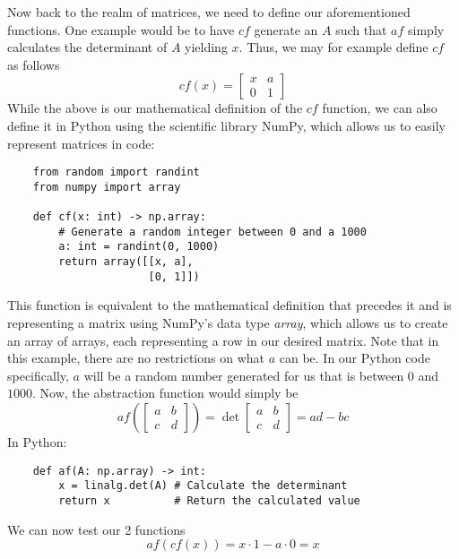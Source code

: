 Now back to the realm of matrices, we need to define our aforementioned
functions. One example would be to have $ cf $ generate an $ A $ such that $ af
$ simply calculates the determinant of $ A $ yielding $ x $. Thus, we may for
example define $ cf $ as follows
\begin{equation*}
    cf(x)
    =
    \begin{bmatrix}
        x & a \\
        0 & 1
    \end{bmatrix}
\end{equation*}
While the above is our mathematical definition of the $ cf $ function, we can
also define it in Python using the scientific library NumPy, which allows us to
easily represent matrices in code:
\begin{verbatim}
    from random import randint
    from numpy import array

    def cf(x: int) -> np.array:
        # Generate a random integer between 0 and a 1000
        a: int = randint(0, 1000)
        return array([[x, a],
                      [0, 1]])
\end{verbatim}
This function is equivalent to the mathematical definition that precedes it and
is representing a matrix using NumPy's data type \textit{array}, which allows
us to
create an array of arrays, each representing a row in our desired matrix. Note
that in this example, there are no restrictions on what $ a $ can be. In our
Python code specifically, $ a $ will be a random number generated for us that
is between $ 0
$ and $ 1000 $. Now, the abstraction
function would simply be
\begin{equation*}
    af \left(
    \begin{bmatrix}
        a & b \\
        c & d
    \end{bmatrix}
    \right)
    =
    \det
    \begin{bmatrix}
        a & b \\
        c & d
    \end{bmatrix}
    = ad - bc
\end{equation*}
In Python:
\begin{verbatim}
    def af(A: np.array) -> int:
        x = linalg.det(A) # Calculate the determinant
        return x          # Return the calculated value
\end{verbatim}
We can now test our 2 functions
\begin{equation*}
    af(cf(x)) = x \cdot 1- a \cdot 0 = x
\end{equation*}

